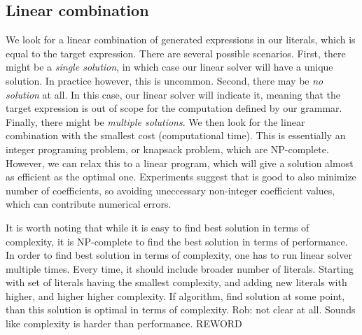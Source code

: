 \subsection{Linear combination}
\label{sec:linear}
We look for a linear combination of generated expressions in our
literals, which is equal to the target expression. There are several
possible scenarios. First, there might be a \emph{single solution}, in
which case our linear solver will have a unique solution. In practice
however, this is uncommon. Second, there may be \emph{no solution} at
all.  In this case, our linear solver will indicate it, meaning that
the target expression is out of scope for the computation defined by
our grammar. Finally, there might be \emph{multiple solutions}. We
then look for the linear combination with the smallest cost
(computational time).  This is essentially an integer programing
problem, or knapsack problem, which are NP-complete. However, we can
relax this to a linear program, which will give a solution almost as
efficient as the optimal one.  Experiments suggest that is good to
also minimize number of coefficients, so avoiding uneccessary
non-integer coefficient values, which can contribute numerical errors.



It is worth noting that while it is easy to find best solution in terms of complexity, it 
is NP-complete to find the best solution in terms of performance. In order to find best solution in terms
of complexity, one has to run linear solver multiple times. Every time, it should include broader number
of literals. Starting with set of literals having the smallest complexity, and adding new literals with
higher, and higher higher complexity. If algorithm, find solution at some point, than this solution is optimal
in terms of complexity. Rob: not clear at all. Sounds like complexity is
harder than performance. REWORD


%


